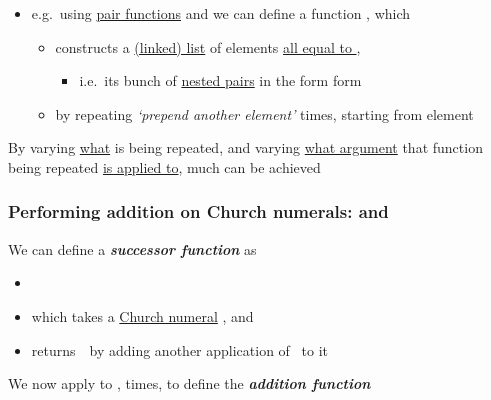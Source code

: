 \begin{itemize}
\tightlist
\item
  e.g.~using \ul{pair functions}  and
   we can define a function
  ,
  which

  \begin{itemize}
  \tightlist
  \item
    constructs a \ul{(linked) list} of  elements \ul{all equal
    to },

    \begin{itemize}
    \tightlist
    \item
      i.e.~its bunch of \ul{nested pairs} in the form form
    \end{itemize}
  \item
    by repeating \textit{`prepend another  element'} 
    times, starting from  element
  \end{itemize}
\end{itemize}

By varying \ul{what} is being repeated, and varying \ul{what argument}
that function being repeated \ul{is applied to}, much can be achieved

\subsubsection*{\texorpdfstring{Performing addition on Church numerals:
 and
\iMbox{(+)}}{Performing addition on Church numerals:  and }}

We can define a \textbf{\textit{successor function}} as

\begin{itemize}
\tightlist
\item
\item
  which takes a \ul{Church numeral}
  , and
\item
  returns~~by adding another application of~ to it
\end{itemize}

We now apply  to ,  times, to
define the \textbf{\textit{addition function}}

